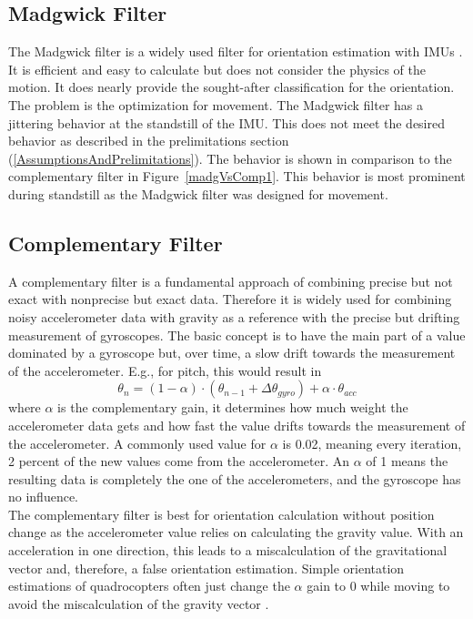 \documentclass[letterpaper, 10 pt, conference]{ieeeconf}  %
\begin{document}
\subsection{Madgwick Filter}
The Madgwick filter is a widely used filter for orientation estimation with IMUs \cite{madgwick2010}.
It is efficient and easy to calculate but does not consider the physics of the motion.
It does nearly provide the sought-after classification for the orientation.
The problem is the optimization for movement. The Madgwick filter has a jittering behavior at the standstill of the IMU.
This does not meet the desired behavior as described in the prelimitations section (\ref{AssumptionsAndPrelimitations}).
The behavior is shown in comparison to the complementary filter in Figure~\ref{madgVsComp1}.
This behavior is most prominent during standstill as the Madgwick filter was designed for movement.
\subsection{Complementary Filter}
A complementary filter is a fundamental approach of combining precise but not exact with nonprecise but exact data.
Therefore it is widely used for combining noisy accelerometer data with gravity as a reference with the precise but drifting measurement of gyroscopes.
The basic concept is to have the main part of a value dominated by a gyroscope but, over time, a slow drift towards the measurement of the accelerometer.
E.g., for pitch, this would result in 
\begin{equation}
\theta_n = (1-\alpha) \cdot (\theta_{n-1}+ \Delta\theta_{gyro})+ \alpha \cdot \theta_{acc}
\end{equation}
where $\alpha$ is the complementary gain, it determines how much weight the accelerometer data gets and how fast the value drifts towards the measurement of the accelerometer.
A commonly used value for $\alpha$ is 0.02, meaning every iteration, 2 percent of the new values come from the accelerometer.
An $\alpha$ of 1 means the resulting data is completely the one of the accelerometers, and the gyroscope has no influence. \\
The complementary filter is best for orientation calculation without position change as the accelerometer value relies on calculating the gravity value.
With an acceleration in one direction, this leads to a miscalculation of the gravitational vector and, therefore, a false orientation estimation.
Simple orientation estimations of quadrocopters often just change the $\alpha$ gain to 0 while moving to avoid the miscalculation of the gravity vector \cite{mahony2005complementary}.
\end{document}
